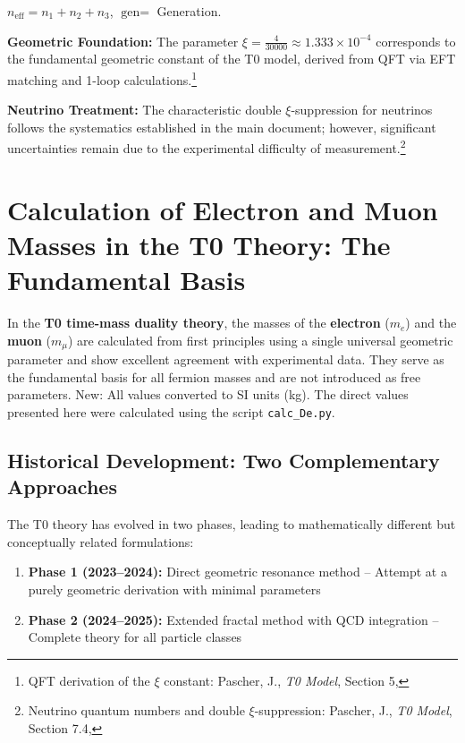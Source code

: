 	$n_{\text{eff}} = n_1 + n_2 + n_3$, $\text{gen} =$ Generation.
	
	\textbf{Geometric Foundation:} The parameter $\xi = \frac{4}{30000} \approx 1.333 \times 10^{-4}$ corresponds to the fundamental geometric constant of the T0 model, derived from QFT via EFT matching and 1-loop calculations.\footnote{QFT derivation of the $\xi$ constant: Pascher, J., \emph{T0 Model}, Section 5, }
	
	\textbf{Neutrino Treatment:} The characteristic double $\xi$-suppression for neutrinos follows the systematics established in the main document; however, significant uncertainties remain due to the experimental difficulty of measurement.\footnote{Neutrino quantum numbers and double $\xi$-suppression: Pascher, J., \emph{T0 Model}, Section 7.4, }
	
	\section{Calculation of Electron and Muon Masses in the T0 Theory: The Fundamental Basis}
	
	In the \textbf{T0 time-mass duality theory}, the masses of the \textbf{electron} ($m_e$) and the \textbf{muon} ($m_\mu$) are calculated from first principles using a single universal geometric parameter and show excellent agreement with experimental data. They serve as the fundamental basis for all fermion masses and are not introduced as free parameters. New: All values converted to SI units (kg). The direct values presented here were calculated using the script \texttt{calc\_De.py}.
	
	\subsection{Historical Development: Two Complementary Approaches}
	
	The T0 theory has evolved in two phases, leading to mathematically different but conceptually related formulations:
	
	\begin{enumerate}
		\item \textbf{Phase 1 (2023--2024):} Direct geometric resonance method -- Attempt at a purely geometric derivation with minimal parameters
		\item \textbf{Phase 2 (2024--2025):} Extended fractal method with QCD integration -- Complete theory for all particle classes
	\end{enumerate}
	

